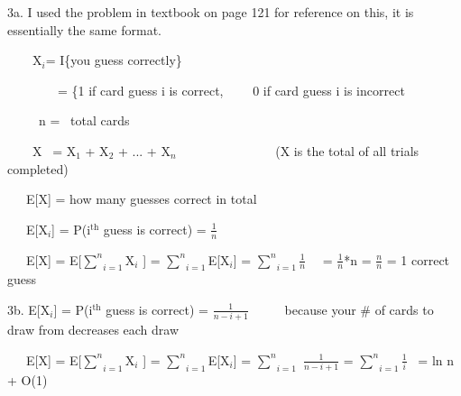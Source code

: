 \documentclass{article}
\newcommand{\tmop}[1]{\ensuremath{\operatorname{#1}}}
\begin{document}
3a. I used the problem in textbook on page 121 for reference on this, it is
essentially the same format.

\ \ \ \ X$_i $= I\{you guess correctly\}

\ \ \ \ \ \ \ \ = \{1 if card guess i is correct, \ \ \ \ 0 if card guess i
is incorrect

\ \ \ \ \ n = \ total cards

\ \ \ \ X \ = X$_1$ + X$_2$ + ... + X$_n$ \ \ \ \ \ \ \ \ \ \ \ \ \ \ \ (X is
the total of all trials completed)

\ \ \ E[X] = how many guesses correct in total

\ \ \ E[X$_i$] = P(i$^{\tmop{th}}$ guess is correct) = $\frac{1}{n}$

\ \ \ E[X] = E[$\underset{i = 1}{\overset{n}{\sum}}$X$_i$ ] = $\underset{i =
1}{\overset{n}{\sum}}$E[X$_i$] = $\underset{i = 1}{\overset{n}{\sum}}
\frac{1}{n}$ \ \ = $\frac{1}{n}$*n = $\frac{n}{n}$ = 1 correct guess



3b. E[X$_i$] = P(i$^{\tmop{th}}$ guess is correct) = $\frac{1}{n - i + 1}$ \ \
\ \ \ because your \# of cards to draw from decreases each draw

\ \ \ E[X] = E[$\underset{i = 1}{\overset{n}{\sum}}$X$_i$ ] = $\underset{i =
1}{\overset{n}{\sum}}$E[X$_i$] = $\underset{i = 1}{\overset{n}{\sum}}$
$\frac{1}{n - i + 1}$ = $\underset{i = 1}{\overset{n}{\sum}} \frac{1}{i}$ \ =
ln n + O(1)
\end{document}
